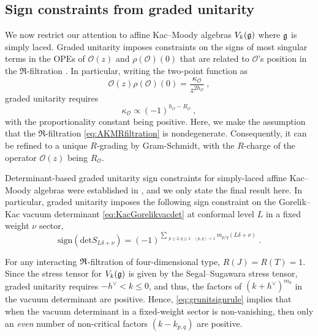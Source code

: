 \subsection{Sign constraints from graded unitarity}
We now restrict our attention to affine Kac--Moody algebras $V_k(\mathfrak{g})$ where $\mathfrak{g}$ is simply laced. Graded unitarity imposes constraints on the signs of most singular terms in the OPEs of $\mathcal{O}(z)$ and $\rho(\mathcal{O})(0)$ that are related to $\mathcal{O}$'s position in the $\mathfrak{R}$-filtration \cite{ArabiArdehali:2025fad}. In particular, writing the two-point function as
\begin{equation}
    \mathcal{O}(z) \rho(\mathcal{O})(0) = \frac{\kappa_{\mathcal{O}}}{z^{2 h_\mathcal{O}}}~,
\end{equation}
graded unitarity requires
\begin{equation}
    \kappa_\mathcal{O} \propto (-1)^{h_{\mathcal{O}} - R_{\mathcal{O}}}~,
\end{equation}
with the proportionality constant being positive. Here, we make the assumption that the $\mathfrak{R}$-filtration \eqref{eq:AKMRfiltration} is nondegenerate. Consequently, it can be refined to a unique $R$-grading by Gram-Schmidt, with the $R$-charge of the operator $\mathcal{O}(z)$ being $R_{\mathcal{O}}$. 

Determinant-based graded unitarity sign constraints for simply-laced affine Kac--Moody algebras were established in \cite{ArabiArdehali:2025fad}, and we only state the final result here. In particular, graded unitarity imposes the following sign constraint on the Gorelik--Kac vacuum determinant \eqref{eq:KacGorelikvacdet} at conformal level $L$ in a fixed weight $\nu$ sector,
\begin{equation} \label{eq:grunitsignrule}
    \mathrm{sign}\left(\mathrm{det}S_{L\delta+\nu} \right) = (-1)^{\sum_{\substack{p \geqslant 2, q \geqslant 1:} (p,q) = 1} m_{p/q}(L\delta + \nu)}~.
\end{equation}

For any interacting $\mathfrak{R}$-filtration of four-dimensional type, $R(J) = R(T) = 1$. Since the stress tensor for $V_k(\mathfrak{g})$ is given by the Segal--Sugawara stress tensor, graded unitarity requires $-h^\vee < k \leqslant 0$, and thus, the factors of $(k+h^\vee)^{m_0}$ in the vacuum determinant are positive. Hence, \eqref{eq:grunitsignrule} implies that when the vacuum determinant in a fixed-weight sector is non-vanishing, then only an \emph{even} number of non-critical factors $(k - k_{p,q})$ are positive.

